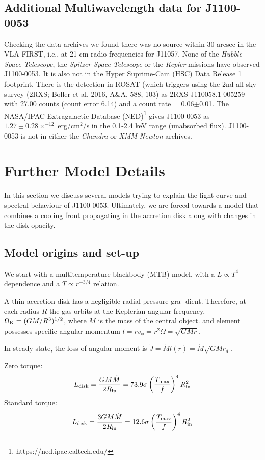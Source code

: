 \documentclass[11pt,a4paper]{article}
\begin{document}
\subsection{Additional Multiwavelength data for J1100-0053}
Checking the data archives we found there was no source within 30
arcsec in the VLA FIRST, i.e., at 21 cm radio frequencies for J11057.
None of the {\it Hubble Space Telescope}, the {\it Spitzer Space
Telescope} or the {\it Kepler} missions have observed J1100-0053.  It is
also not in the Hyper Suprime-Cam (HSC)
\href{https://hsc-release.mtk.nao.ac.jp/doc/}{Data Release 1}
\citep{Aihara2017} footprint. There is the detection in ROSAT (which
triggers using the 2nd all-sky survey (2RXS; Boller et al. 2016, A\&A,
588, 103) as 2RXS J110058.1-005259 with 27.00 counts (count error
6.14) and a count rate = 0.06$\pm$0.01. The  NASA/IPAC Extragalactic Database 
(NED)\footnote{https://ned.ipac.caltech.edu/} gives J1100-0053 as
$1.27\pm0.28 \times^{-12}$ erg/cm$^{2}$/s in the 0.1-2.4 keV range
(unabsorbed flux). J1100-0053 is not in either the {\it Chandra} or {\it
XMM-Newton} archives. 


\section{Further Model Details}
In this section we discuss several models trying to explain the light
curve and spectral behaviour of J1100-0053. Ultimately, we are forced
towards a model that combines a cooling front propagating in the
accretion disk along with changes in the disk opacity. 


\subsection{Model origins and set-up}
We start with a multitemperature blackbody (MTB) model, with a $L
\propto T^4$ dependence and a $T \propto r^{-3/4}$ relation.

A thin accretion disk has a negligible radial pressure gra-
dient. Therefore, at each radius $R$ the gas orbits at the Keplerian
angular frequency, $\Omega_{\rm K} = (GM/R^{3})^{1/2}$, where $M$ is
the mass of the central object.  and element possesses specific
angular momentum $l = r v_{\phi} = r^{2} \Omega = \sqrt{GMr}$.

In steady state, the loss of angular moment is $\dot{J} = \dot{M} l(r)
= \dot{M} \sqrt{GMr_{d}}$.

Zero torque: 
\begin{equation}
L_{\rm disk}   =  \frac{G M \dot{M}}  {2 R_{\rm in}}    = 73.9 \sigma\left ( \frac{T_{\rm max}}{f}  \right )^{4}  R^{2}_{\rm in} 
\end{equation}
Standard torque: 
\begin{equation}
L_{\rm disk} = \frac{3 G M \dot{M}}  {2 R_{\rm in}}    = 12.6 \sigma\left ( \frac{T_{\rm max}}{f}  \right )^{4}  R^{2}_{\rm in} 
\end{equation}
\end{document}

